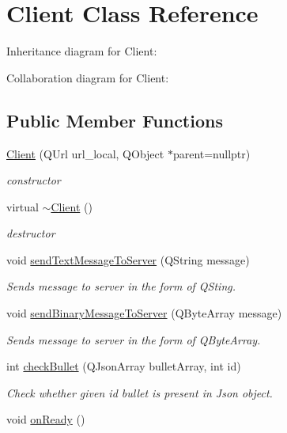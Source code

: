 \hypertarget{class_client}{}\section{Client Class Reference}
\label{class_client}


Inheritance diagram for Client\+:


Collaboration diagram for Client\+:
\subsection*{Public Member Functions}
\begin{DoxyCompactItemize}
\item 
\hyperlink{class_client_afa3b3e88df2f4ae65279e8a5a5f45ce5}{Client} (Q\+Url url\+\_\+local, Q\+Object $\ast$parent=nullptr)
\begin{DoxyCompactList}\small\item\em constructor \end{DoxyCompactList}\item 
virtual \hyperlink{class_client_a840e519ca781888cbd54181572ebe3a7}{$\sim$\+Client} ()\hypertarget{class_client_a840e519ca781888cbd54181572ebe3a7}{}\label{class_client_a840e519ca781888cbd54181572ebe3a7}

\begin{DoxyCompactList}\small\item\em destructor \end{DoxyCompactList}\item 
void \hyperlink{class_client_a1aa5fef5094191fd7cdd6b5c15732c0e}{send\+Text\+Message\+To\+Server} (Q\+String message)
\begin{DoxyCompactList}\small\item\em Sends message to server in the form of Q\+Sting. \end{DoxyCompactList}\item 
void \hyperlink{class_client_ac7ece460fde6a00764881948666642bd}{send\+Binary\+Message\+To\+Server} (Q\+Byte\+Array message)
\begin{DoxyCompactList}\small\item\em Sends message to server in the form of Q\+Byte\+Array. \end{DoxyCompactList}\item 
int \hyperlink{class_client_a86df5016c5324b5b7d8e5918f8df3b4d}{check\+Bullet} (Q\+Json\+Array bullet\+Array, int id)
\begin{DoxyCompactList}\small\item\em Check whether given id bullet is present in Json object. \end{DoxyCompactList}\item 
void \hyperlink{class_client_a1db86ef88630bbb83901a5cd78568a1f}{on\+Ready} ()\hypertarget{class_client_a1db86ef88630bbb83901a5cd78568a1f}{}\label{class_client_a1db86ef88630bbb83901a5cd78568a1f}


\end{DoxyCompactItemize}

